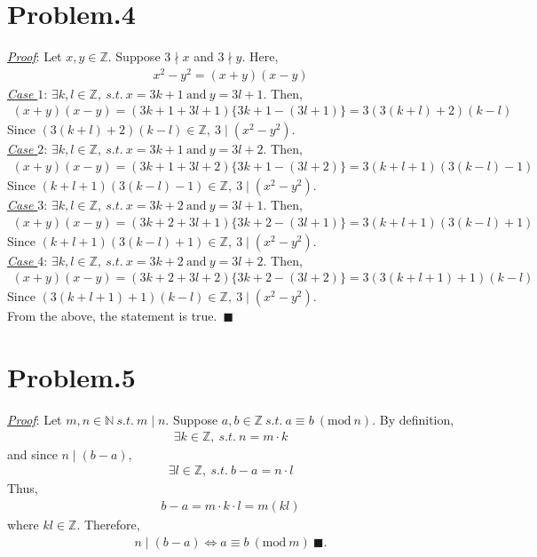 \documentclass[12pt]{article}
\begin{document}
\section*{Problem.4}
\underline{\textit{Proof}}: Let $x, y \in \mathbb{Z}$. Suppose $3 \nmid x$ and $3 \nmid y$. Here,
\begin{gather*}
x^2 - y^2 =(x+y)(x-y)
\end{gather*}
\underline{\textit{Case $1$}}: $\exists k, l \in \mathbb{Z},~s.t.~ x = 3k + 1 ~\mathrm{and}~ y = 3l + 1$.
Then,
\begin{gather*}
(x+y)(x-y) = (3k + 1 + 3l + 1)\{3k + 1 -(3l + 1)\} = 3(3(k+l)+2)(k-l)
\end{gather*}
Since $ (3(k+l)+2)(k-l) \in \mathbb{Z}, ~3 \mid (x^2 - y^2)$.\\[1em]
\underline{\textit{Case $2$}}: $\exists k, l \in \mathbb{Z},~s.t.~ x = 3k + 1 ~\mathrm{and}~ y = 3l + 2$.
Then,
\begin{gather*}
(x+y)(x-y) = (3k + 1 + 3l + 2)\{3k + 1 -(3l + 2)\} = 3(k+l+1)(3(k-l)-1)
\end{gather*}
Since $ (k+l+1)(3(k-l)-1) \in \mathbb{Z}, ~3 \mid (x^2 - y^2)$.\\[1em]
\underline{\textit{Case $3$}}: $\exists k, l \in \mathbb{Z},~s.t.~ x = 3k + 2 ~\mathrm{and}~ y = 3l + 1$.
Then,
\begin{gather*}
(x+y)(x-y) = (3k + 2 + 3l + 1)\{3k + 2 -(3l + 1)\} = 3(k+l+1)(3(k-l)+1)
\end{gather*}
Since $ (k+l+1)(3(k-l)+1) \in \mathbb{Z}, ~3 \mid (x^2 - y^2)$.\\[1em]
\underline{\textit{Case $4$}}: $\exists k, l \in \mathbb{Z},~s.t.~ x = 3k + 2 ~\mathrm{and}~ y = 3l + 2$.
Then,
\begin{gather*}
(x+y)(x-y) = (3k + 2 + 3l + 2)\{3k + 2 -(3l + 2)\} = 3(3(k+l+1)+1)(k-l)
\end{gather*}
Since $ (3(k+l+1)+1)(k-l) \in \mathbb{Z}, ~3 \mid (x^2 - y^2)$.\\[1em]
From the above, the statement is true.~$\blacksquare$

\section*{Problem.5}
\underline{\textit{Proof}}: Let $m, n \in \mathbb{N} ~s.t.~ m \mid n$.
Suppose $a, b \in \mathbb{Z}~s.t.~a \equiv b~(\mathrm{mod}~n)$. By definition,
\begin{gather*}
\exists k \in \mathbb{Z},~s.t.~ n = m \cdot k
\end{gather*}
and since $n \mid (b - a)$,
\begin{gather*}
\exists l \in \mathbb{Z},~s.t.~ b - a = n \cdot l
\end{gather*}
Thus, 
\begin{gather*}
b - a = m \cdot k \cdot l = m (kl)
\end{gather*}
where $kl \in \mathbb{Z}$. Therefore,
\begin{gather*}
n \mid (b - a) \Leftrightarrow a \equiv b~(\mathrm{mod}~m)~\blacksquare.
\end{gather*}
\end{document}
